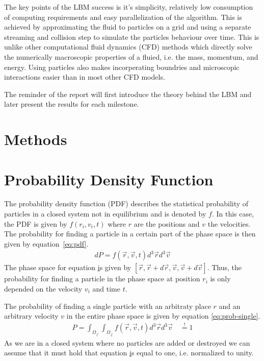 \documentclass[a4paper,11pt]{article}
\begin{document}
The key points of the LBM success is it's simplicity, relatively low consumption of computing requirements and easy parallelization of the algorithm.
This is achieved by approximating the fluid to particles on a grid and using a separate streaming and collision step to simulate the particles behaviour over time.
This is unlike other computational fluid dynamics (CFD) methods which directly solve the numerically macroscopic properties of a fluied, i.e. the mass, momentum, and energy.
Using particles also makes incorperating boundries and microscopic interactions easier than in most other CFD models.

The reminder of the report will first introduce the theory behind the LBM and later present the results for each milestone.

\section{Methods}
\section{Probability Density Function}
The probability density function (PDF) describes the statistical probability of particles in a closed system not in equilibrium and is denoted by $f$.
In this case, the PDF is given by $f(r_i,v_i,t)$ where $r$ are the positions and $v$ the velocities.
The probability for finding a particle in a certain part of the phase space is then given by equation~\ref{eq:pdf}.
\begin{equation}
    \label{eq:pdf}
    \begin{aligned}
        dP = f(\vec{r},\vec{v},t) d^{3}\vec{r} d^{3}\vec{v}
    \end{aligned}
\end{equation}
The phase space for equation \href{eq:pdf} is given by $[\vec{r}, \vec{r}+d\vec{r}, \vec{v}, \vec{v}+d\vec{v}]$.
Thus, the probability for finding a particle in the phase space at position $r_i$ is only depended on the velocity $v_i$ and time $t$.

The probability of finding a single particle with an arbitraty place $r$ and an arbitrary velocity $v$ in the entire phase space is given by equation \ref{eq:prob-single}.
\begin{equation}
    \label{eq:prob-single}
    \begin{aligned}
        P = \int_{\Omega_{\vec{r}}} \int_{\Omega_{\vec{v}}}  f(\vec{r},\vec{v},t) d^{3}\vec{r} d^{3}\vec{v} \quad \overset{!}{=} 1
    \end{aligned}
\end{equation}
As we are in a closed system where no particles are added or destroyed we can assume that it must hold that equation \href{eq:prob-single} is equal to one, i.e. normalized to unity.
\end{document}
